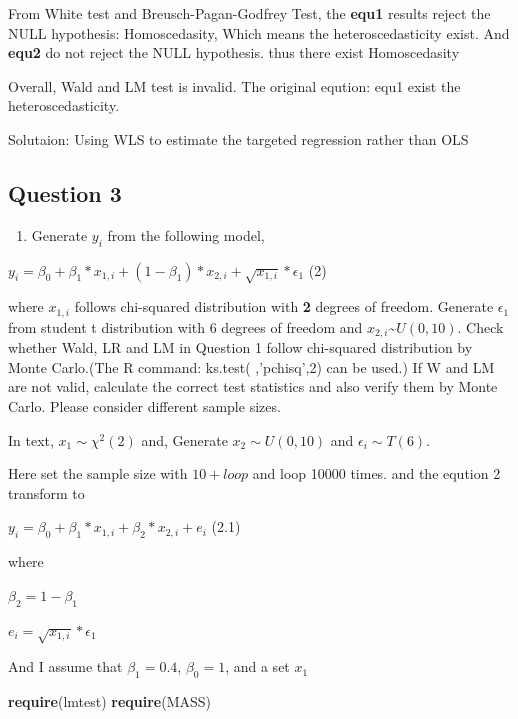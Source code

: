 \documentclass[]{article}
\newenvironment{Shaded}{\begin{snugshade}}{\end{snugshade}}
\newcommand{\KeywordTok}[1]{\textcolor[rgb]{0.13,0.29,0.53}{\textbf{{#1}}}}
\newcommand{\NormalTok}[1]{{#1}}
\providecommand{\tightlist}{%
  \setlength{\itemsep}{0pt}\setlength{\parskip}{0pt}}
\begin{document}
From White test and Breusch-Pagan-Godfrey Test, the \textbf{equ1}
results reject the NULL hypothesis: Homoscedasity, Which means the
heteroscedasticity exist. And \textbf{equ2} do not reject the NULL
hypothesis. thus there exist Homoscedasity

Overall, Wald and LM test is invalid. The original eqution: equ1 exist
the heteroscedasticity.

Solutaion: Using WLS to estimate the targeted regression rather than OLS

\subsection{Question 3}\label{question-3}

\begin{enumerate}
\def\labelenumi{\arabic{enumi}.}
\setcounter{enumi}{2}
\tightlist
\item
  Generate \(y_{i}\) from the following model,
\end{enumerate}

\centerline{$y_i = \beta_0 + \beta_{1}*x_{1,i} +(1-\beta_{1})*x_{2,i} +\sqrt{x_{1,i}}*\epsilon_{1}$   (2)}

where \(x_{1,i}\) follows chi-squared distribution with \textbf{2}
degrees of freedom. Generate \(\epsilon_{1}\) from student t
distribution with 6 degrees of freedom and
\(x_{2,i}\)\textasciitilde{}\(U(0,10)\). Check whether Wald, LR and LM
in Question 1 follow chi-squared distribution by Monte Carlo.(The R
command: ks.test( ,'pchisq',2) can be used.) If W and LM are not valid,
calculate the correct test statistics and also verify them by Monte
Carlo. Please consider different sample sizes.

In text, \(x_1\sim\chi^2(2)\) and, Generate \(x_2\sim{U(0,10)}\) and
\(\epsilon_i\sim{T(6)}\).

Here set the sample size with \(10+loop\) and loop 10000 times. and the
eqution 2 transform to

\centerline{$y_i = \beta_0 + \beta_{1}*x_{1,i} +\beta_2*x_{2,i} +e_i$   (2.1)}

where

\centerline{$\beta_{2}=1-\beta_{1}$}\centerline{$e_i=\sqrt{x_{1,i}}*\epsilon_{1}$}

And I assume that \(\beta_1 = 0.4\), \(\beta_0=1\), and a set \(x_1\)

\begin{Shaded}
\begin{Highlighting}[]
\KeywordTok{require}\NormalTok{(lmtest)}
\KeywordTok{require}\NormalTok{(MASS)}
\end{Highlighting}
\end{Shaded}
\end{document}
